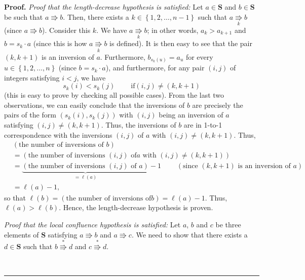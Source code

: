 \documentclass[numbers=enddot,12pt,final,onecolumn,notitlepage]{scrartcl}%
\theoremstyle{definition}
\newenvironment{proof}[1][Proof]{\noindent\textbf{#1.} }{\ \rule{0.5em}{0.5em}}
\begin{document}
\begin{proof}
\textit{Proof that the length-decrease hypothesis is satisfied:} Let
$a\in\mathbf{S}$ and $b\in\mathbf{S}$ be such that $a\Rrightarrow b$. Then,
there exists a $k\in\left\{  1,2,\ldots,n-1\right\}  $ such that
$a\underset{k}{\Rrightarrow}b$ (since $a\Rrightarrow b$). Consider this $k$.
We have $a\underset{k}{\Rrightarrow}b$; in other words, $a_{k}>a_{k+1}$ and
$b=s_{k}\cdot a$ (since this is how $a\underset{k}{\Rrightarrow}b$ is
defined). It is then easy to see that the pair $\left(  k,k+1\right)  $ is an
inversion of $a$. Furthermore, $b_{s_{k}\left(  u\right)  }=a_{u}$ for every
$u\in\left\{  1,2,\ldots,n\right\}  $ (since $b=s_{k}\cdot a$), and
furthermore, for any pair $\left(  i,j\right)  $ of integers satisfying $i<j$,
we have%
\begin{equation}
s_{k}\left(  i\right)  <s_{k}\left(  j\right)  \ \ \ \ \ \ \ \ \ \ \text{if
}\left(  i,j\right)  \neq\left(  k,k+1\right)
\label{pf.prop.diamond.example.poset.inversion-transform}%
\end{equation}
(this is easy to prove by checking all possible cases). From the last two
observations, we can easily conclude that the inversions of $b$ are precisely
the pairs of the form $\left(  s_{k}\left(  i\right)  ,s_{k}\left(  j\right)
\right)  $ with $\left(  i,j\right)  $ being an inversion of $a$ satisfying
$\left(  i,j\right)  \neq\left(  k,k+1\right)  $. Thus, the inversions of $b$
are in 1-to-1 correspondence with the inversions $\left(  i,j\right)  $ of $a$
with $\left(  i,j\right)  \neq\left(  k,k+1\right)  $. Thus,%
\begin{align*}
&  \left(  \text{the number of inversions of }b\right) \\
&  =\left(  \text{the number of inversions }\left(  i,j\right)  \text{ of
}a\text{ with }\left(  i,j\right)  \neq\left(  k,k+1\right)  \right) \\
&  =\underbrace{\left(  \text{the number of inversions }\left(  i,j\right)
\text{ of }a\right)  }_{=\ell\left(  a\right)  }-1\ \ \ \ \ \ \ \ \ \ \left(
\text{since }\left(  k,k+1\right)  \text{ is an inversion of }a\right) \\
&  =\ell\left(  a\right)  -1,
\end{align*}
so that $\ell\left(  b\right)  =\left(  \text{the number of inversions of
}b\right)  =\ell\left(  a\right)  -1$. Thus, $\ell\left(  a\right)
>\ell\left(  b\right)  $. Hence, the length-decrease hypothesis is proven.

\textit{Proof that the local confluence hypothesis is satisfied:} Let $a$, $b$
and $c$ be three elements of $\mathbf{S}$ satisfying $a\Rrightarrow b$ and
$a\Rrightarrow c$. We need to show that there exists a $d\in\mathbf{S}$ such
that $b\overset{\ast}{\Rrightarrow}d$ and $c\overset{\ast}{\Rrightarrow}d$.


\end{proof}
\end{document}
